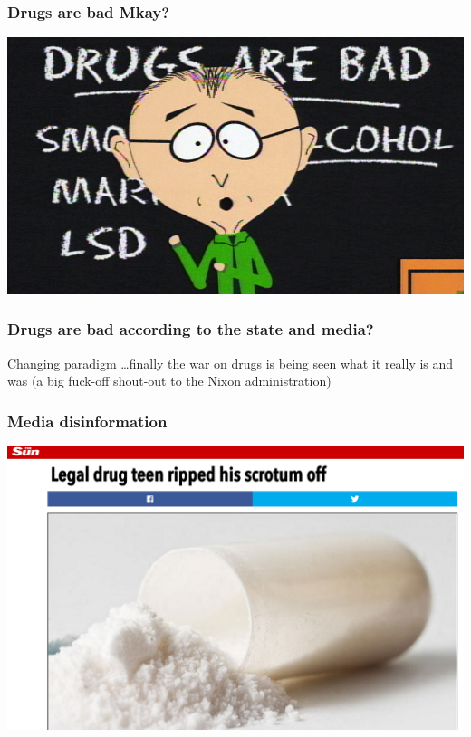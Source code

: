 \documentclass[a4paper]{beamer}
\begin{document}
\begin{frame}
	\frametitle{Drugs are bad Mkay?}
	\begin{center}
		\includegraphics[scale=0.40]{img/south-park-s02e04c01-drugs-are-bad-16x9.jpg}
	\end{center}
\end{frame}

\begin{frame}
	\frametitle{Drugs are bad according to the state and media?}
	Changing paradigm \ldots finally the war on drugs is being seen what it really is and was (a big fuck-off shout-out to the Nixon administration)
\end{frame}

\begin{frame}
	\frametitle{Media disinformation}
	\begin{center}
		\includegraphics[scale=0.20]{img/theSunScrotum.png}
	\end{center}
\end{frame}
\end{document}
